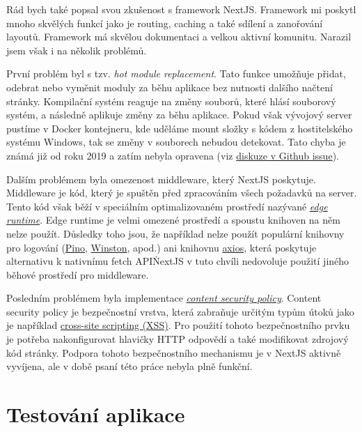 Rád bych také popsal svou zkušenost s framework NextJS\@.
Framework mi poskytl mnoho skvělých funkcí jako je routing, caching a také sdílení a zanořování layoutů.
Framework má skvělou dokumentaci a velkou aktivní komunitu.
Narazil jsem však i na několik problémů.

První problém byl s tzv. \textit{hot module replacement}.
Tato funkce umožňuje přidat, odebrat nebo vyměnit moduly za běhu aplikace bez nutnosti dalšího načtení stránky.
Kompilační systém reaguje na změny souborů, které hlásí souborový systém, a následně aplikuje změny za běhu aplikace.
Pokud však vývojový server pustíme v Docker kontejneru, kde uděláme mount složky s kódem z hostitelského systému Windows, tak se změny v souborech nebudou detekovat.
Tato chyba je známá již od roku 2019 a zatím nebyla opravena (viz \href{https://github.com/microsoft/WSL/issues/4739}{diskuze v Github issue}).

Dalším problémem byla omezenost middleware, který NextJS poskytuje.
Middleware je kód, který je spuštěn před zpracováním všech požadavků na server.
Tento kód však běží v speciálním optimalizovaném prostředí nazývané \textit{\href{https://edge-runtime.vercel.app/}{edge runtime}}.
Edge runtime je velmi omezené prostředí a spoustu knihoven na něm nelze použít.
Důsledky toho jsou, že například nelze použít populární knihovny pro logování (\href{https://github.com/pinojs/pino}{Pino}, \href{https://github.com/winstonjs/winston}{Winston}, apod.) ani knihovnu \href{https://github.com/axios/axios}{axios}, která poskytuje alternativu k nativnímu fetch API\.
NextJS v tuto chvíli nedovoluje použití jiného běhové prostředí pro middleware.

Posledním problémem byla implementace \textit{\href{https://developer.mozilla.org/en-US/docs/Web/HTTP/CSP}{content security policy}}.
Content security policy je bezpečnostní vrstva, která zabraňuje určitým typům útoků jako je například \href{https://developer.mozilla.org/en-US/docs/Glossary/Cross-site_scripting}{cross-site scripting (XSS)}.
Pro použití tohoto bezpečnostního prvku je potřeba nakonfigurovat hlavičky HTTP odpovědí a také modifikovat zdrojový kód stránky.
Podpora tohoto bezpečnostního mechanismu je v NextJS aktivně vyvíjena, ale v době psaní této práce nebyla plně funkční.


\section{Testování aplikace}\label{sec:testovani-aplikace}

